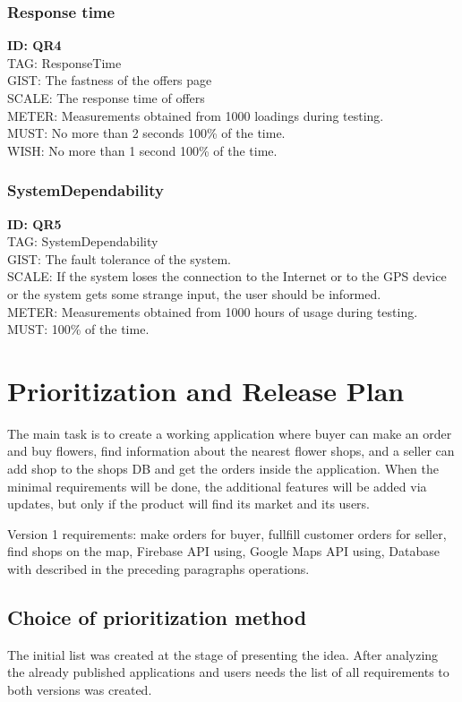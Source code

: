 \documentclass{scrreprt}
\begin{document}
\subsection{Response time}
\textbf{ID: QR4}\\
TAG: ResponseTime\\
GIST: The fastness of the offers page\\
SCALE: The response time of offers\\
METER: Measurements obtained from 1000 loadings during testing.\\
MUST: No more than 2 seconds 100\% of the time.\\
WISH: No more than 1 second 100\% of the time.

\subsection{SystemDependability}
\textbf{ID: QR5}\\
TAG: SystemDependability\\
GIST: The fault tolerance of the system.\\
SCALE: If the system loses the connection to the Internet or to the GPS device or the system gets some
strange input, the user should be informed.\\
METER: Measurements obtained from 1000 hours of usage during testing.\\
MUST: 100\% of the time.

\chapter{Prioritization and Release Plan}
The main task is to create a working application where buyer can make an order and buy flowers, find information about the nearest flower shops, and a seller can add shop to the shops DB and get the orders inside the application. When the minimal requirements will be done, the additional features will be added via updates, but only if the product will find its market and its users.

Version 1 requirements: make orders for buyer, fullfill customer orders for seller, find shops on the map, Firebase API using, Google Maps API using, Database with  described in the preceding paragraphs operations.

\section{Choice of prioritization method}
The initial list was created at the stage of presenting the idea. After analyzing the already published applications and users needs the list of all requirements to both versions was created.
\end{document}
